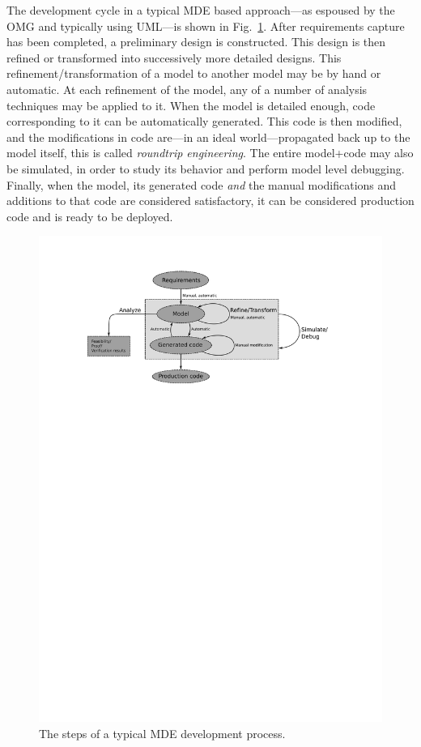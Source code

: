 The development cycle in a typical MDE based approach---as espoused by
the OMG and typically using UML---is shown in
Fig.~\ref{fig:mde_chain}. After requirements capture has been
completed, a preliminary design is constructed. This design is then
refined or transformed into successively more detailed designs. This
refinement/transformation of a model to another model may be by hand
or automatic. At each refinement of the model, any of a number of
analysis techniques may be applied to it. When the model is detailed
enough, code corresponding to it can be automatically generated. This
code is then modified, and the modifications in code are---in an ideal
world---propagated back up to the model itself, this is called
\emph{roundtrip engineering}. The entire model+code may also be
simulated, in order to study its behavior and perform model level
debugging. Finally, when the model, its generated code \emph{and} the
manual modifications and additions to that code are considered
satisfactory, it can be considered production code and is ready to be
deployed.

\begin{figure}
\centering
\includegraphics[scale=1.0]{figs/mde_chain}
\caption{The steps of a typical MDE development process.}
\label{fig:mde_chain}
\end{figure}

